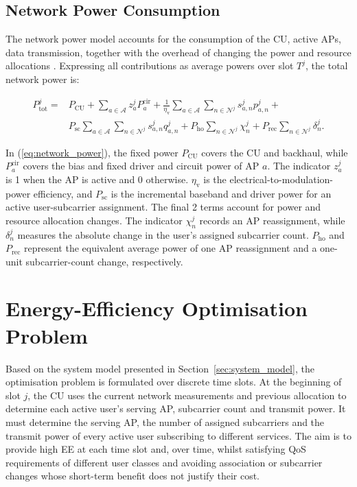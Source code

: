 \documentclass[journal]{IEEEtran}
\begin{document}
\subsection{Network Power Consumption}

The network power model accounts for the consumption of the CU,
active APs, data transmission, together with the overhead
of changing the power and resource allocations \cite{Murdock2014,Ncube2025Predictive}. Expressing all contributions
as average powers over slot $T^j$, the total network power is:

\begin{align}
P_{\mathrm{tot}}^{j}
={}&P_{\mathrm{CU}}
+\sum_{a\in\mathcal{A}}z_a^j P_a^{\mathrm{cir}} +\frac{1}{\eta_{\mathrm{v}}}
\sum_{a\in\mathcal{A}}\sum_{n\in\mathcal{N}^{j}}
s_{a,n}^{j}p_{a,n}^{j} +
\nonumber\\
&P_{\mathrm{sc}}
\sum_{a\in\mathcal{A}}\sum_{n\in\mathcal{N}^{j}}
s_{a,n}^{j}q_{a,n}^{j}
+P_{\mathrm{ho}}\sum_{n\in\mathcal{N}^{j}}\chi_n^j
+P_{\mathrm{rec}}\sum_{n\in\mathcal{N}^{j}}\delta_n^j.
\label{eq:network_power}
\end{align}

In  (\ref{eq:network_power}), the fixed power $P_{\mathrm{CU}}$ covers the CU and
backhaul, while $P_a^{\mathrm{cir}}$ covers the bias and fixed
driver and circuit power of AP $a$. The indicator $z_a^j$
is 1 when the AP is active and 0 otherwise. $\eta_{\mathrm{v}}$ is the electrical-to-modulation-power efficiency, and $P_{\mathrm{sc}}$ is the incremental baseband and driver power for an active user-subcarrier assignment. The final 2 terms account for power and resource allocation changes. The indicator
$\chi_n^j$ records an AP reassignment, while $\delta_n^j$ measures
the absolute change in the user's assigned subcarrier count. $P_{\mathrm{ho}}$ and $P_{\mathrm{rec}}$ represent
the equivalent average power of one AP reassignment and a one-unit
subcarrier-count change, respectively. 

\section{Energy-Efficiency Optimisation Problem}
\label{sec:optimisation_problem}

Based on the system model presented in Section~\ref{sec:system_model}, the optimisation problem is formulated over discrete time slots. At the beginning of slot $j$, the CU uses the current network measurements and previous allocation to determine each active user's serving AP, subcarrier count and transmit power. It must determine the serving AP, the number of assigned subcarriers and the transmit power of every active user subscribing to different services. The aim is to  provide high EE at each time slot and, over time, whilst satisfying QoS requirements of different user classes and avoiding association or subcarrier changes whose short-term benefit does not justify their cost.
\end{document}
